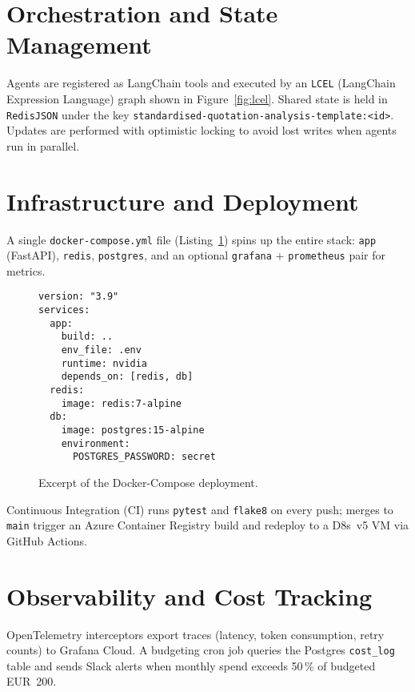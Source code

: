 \section{Orchestration and State Management}
Agents are registered as LangChain tools and executed by an \texttt{LCEL} (LangChain Expression Language) graph shown in Figure~\ref{fig:lcel}.  Shared state is held in \texttt{RedisJSON} under the key \texttt{standardised-quotation-analysis-template:\textless{}id\textgreater{}}.  Updates are performed with optimistic locking to avoid lost writes when agents run in parallel.

\section{Infrastructure and Deployment}
A single \texttt{docker-compose.yml} file (Listing~\ref{lst:compose}) spins up the entire stack: \texttt{app} (FastAPI), \texttt{redis}, \texttt{postgres}, and an optional \texttt{grafana} + \texttt{prometheus} pair for metrics.
\begin{figure}[H]
\centering
\begin{minipage}{0.9\textwidth}
\begin{verbatim}
version: "3.9"
services:
  app:
    build: ..
    env_file: .env
    runtime: nvidia
    depends_on: [redis, db]
  redis:
    image: redis:7-alpine
  db:
    image: postgres:15-alpine
    environment:
      POSTGRES_PASSWORD: secret
\end{verbatim}
\end{minipage}
\caption{Excerpt of the Docker-Compose deployment.}
\label{lst:compose}
\end{figure}
Continuous Integration (CI) runs \texttt{pytest} and \texttt{flake8} on every push; merges to \texttt{main} trigger an Azure Container Registry build and redeploy to a D8s~v5 VM via GitHub Actions.

\section{Observability and Cost Tracking}
OpenTelemetry interceptors export traces (latency, token consumption, retry counts) to Grafana Cloud.  A budgeting cron job queries the Postgres \texttt{cost\_log} table and sends Slack alerts when monthly spend exceeds 50\,\% of budgeted EUR~200.

